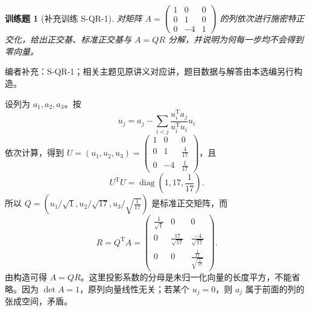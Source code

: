 \documentclass[12pt,fontset=fandol]{ctexart}
\newtheorem{exercise}{训练题}[section]
\begin{document}
\begin{exercise}[补充训练 S-QR-1]\label{prob:S-QR-1}
对矩阵 $A=\begin{pmatrix}1&0&0\\0&1&0\\0&-4&1\end{pmatrix}$ 的列依次进行施密特正交化，给出正交基、标准正交基与 $A=QR$ 分解，并说明为何每一步均不会得到零向量。
\end{exercise}
\noindent 编者补充：S-QR-1；相关主题见原讲义对应讲，题目数据与解答由本选编另行构造。
\begin{solve}
设列为 $a_1,a_2,a_3$。按
\[u_j=a_j-\sum_{i<j}\frac{u_i^{\mathrm T}a_j}{u_i^{\mathrm T}u_i}u_i\]
依次计算，得到 $U=(u_1,u_2,u_3)=\begin{pmatrix}1&0&0\\0&1&\frac{4}{17}\\0&-4&\frac{1}{17}\end{pmatrix}$，且
\[U^{\mathrm T}U=\operatorname{diag}(1,17,\frac{1}{17}).\]
所以 $Q=\left(u_1/\sqrt{1},u_2/\sqrt{17},u_3/\sqrt{\frac{1}{17}}\right)$ 是标准正交矩阵，而
\[R=Q^{\mathrm T}A=\begin{pmatrix}\frac{1}{\sqrt{1}}&0&0\\0&\frac{17}{\sqrt{17}}&\frac{-4}{\sqrt{17}}\\0&0&\frac{\frac{1}{17}}{\sqrt{\frac{1}{17}}}\end{pmatrix}.\]
由构造可得 $A=QR$。这里投影系数的分母是未归一化向量的长度平方，不能省略。因为 $\det A=1$，原列向量线性无关；若某个 $u_j=0$，则 $a_j$ 属于前面的列的张成空间，矛盾。
\end{solve}
\end{document}
